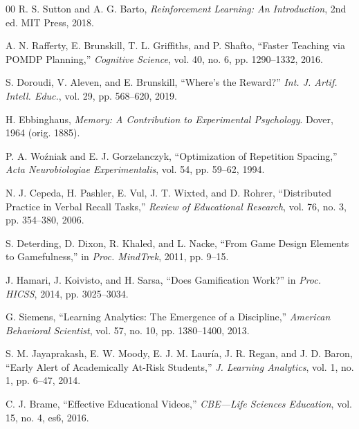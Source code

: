 \documentclass[conference]{IEEEtran}
\begin{document}
\begin{thebibliography}{00}
 R. S. Sutton and A. G. Barto, \textit{Reinforcement Learning: An Introduction}, 2nd ed. MIT Press, 2018.

 A. N. Rafferty, E. Brunskill, T. L. Griffiths, and P. Shafto, ``Faster Teaching via POMDP Planning,'' \textit{Cognitive Science}, vol. 40, no. 6, pp. 1290--1332, 2016.

 S. Doroudi, V. Aleven, and E. Brunskill, ``Where's the Reward?'' \textit{Int. J. Artif. Intell. Educ.}, vol. 29, pp. 568--620, 2019.

 H. Ebbinghaus, \textit{Memory: A Contribution to Experimental Psychology}. Dover, 1964 (orig. 1885).

 P. A. Woźniak and E. J. Gorzelanczyk, ``Optimization of Repetition Spacing,'' \textit{Acta Neurobiologiae Experimentalis}, vol. 54, pp. 59--62, 1994.

 N. J. Cepeda, H. Pashler, E. Vul, J. T. Wixted, and D. Rohrer, ``Distributed Practice in Verbal Recall Tasks,'' \textit{Review of Educational Research}, vol. 76, no. 3, pp. 354--380, 2006.

 S. Deterding, D. Dixon, R. Khaled, and L. Nacke, ``From Game Design Elements to Gamefulness,'' in \textit{Proc. MindTrek}, 2011, pp. 9--15.

 J. Hamari, J. Koivisto, and H. Sarsa, ``Does Gamification Work?'' in \textit{Proc. HICSS}, 2014, pp. 3025--3034.

 G. Siemens, ``Learning Analytics: The Emergence of a Discipline,'' \textit{American Behavioral Scientist}, vol. 57, no. 10, pp. 1380--1400, 2013.

 S. M. Jayaprakash, E. W. Moody, E. J. M. Lauría, J. R. Regan, and J. D. Baron, ``Early Alert of Academically At-Risk Students,'' \textit{J. Learning Analytics}, vol. 1, no. 1, pp. 6--47, 2014.

 C. J. Brame, ``Effective Educational Videos,'' \textit{CBE---Life Sciences Education}, vol. 15, no. 4, es6, 2016.

\end{thebibliography}
\end{document}
